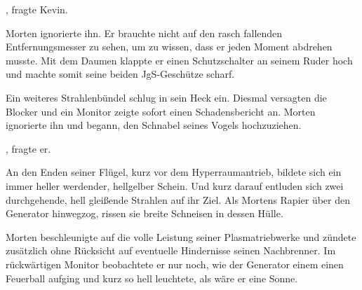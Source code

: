 \par

, fragte Kevin.

\par

Morten ignorierte ihn. Er brauchte nicht auf den rasch fallenden Entfernungsmesser zu sehen, um zu wissen, dass er jeden Moment abdrehen musste. Mit dem Daumen klappte er einen Schutzschalter an seinem Ruder hoch und machte somit seine beiden JgS-Geschütze scharf.

\par

Ein weiteres Strahlenbündel schlug in sein Heck ein. Diesmal versagten die Blocker und ein Monitor zeigte sofort einen Schadensbericht an. Morten ignorierte ihn und begann, den Schnabel seines Vogels hochzuziehen.

\par

, fragte er. 

\par

An den Enden seiner Flügel, kurz vor dem Hyperraumantrieb, bildete sich ein immer heller werdender, hellgelber Schein. Und kurz darauf entluden sich zwei durchgehende, hell gleißende Strahlen auf ihr Ziel. Als Mortens Rapier über den Generator hinwegzog, rissen sie breite Schneisen in dessen Hülle.

\par

Morten beschleunigte auf die volle Leistung seiner Plasmatriebwerke und zündete zusätzlich ohne Rücksicht auf eventuelle Hindernisse seinen Nachbrenner. Im rückwärtigen Monitor beobachtete er nur noch, wie der Generator einem einen Feuerball aufging und kurz so hell leuchtete, als wäre er eine Sonne.